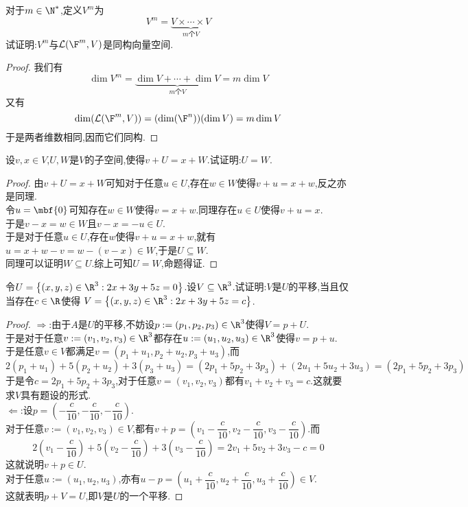 \documentclass{ctexart}
\begin{document}
\begin{problem}[5.]
    对于$m\in\N^*$,定义$V^m$为
    $$V^m=\underbrace{V\times\cdots\times V}_{m\text{个}V}$$
    试证明:$V^m$与$\mathcal{L}(\F^m,V)$是同构向量空间.
\end{problem}
\begin{proof}
    我们有$$\dim V^m=\underbrace{\dim V+\cdots+\dim V}_{m\text{个}V}=m\dim V$$
    又有$$\dim(\mathcal{L}(\F^m,V))=(\dim(\F^n))(\dim V)=m\dim V$$
    于是两者维数相同,因而它们同构.
\end{proof}
\begin{problem}[6.]
    设$v,x\in V$,$U,W$是$V$的子空间,使得$v+U=x+W$.试证明:$U=W$.
\end{problem}
\begin{proof}
    由$v+U=x+W$可知对于任意$u\in U$,存在$w\in W$使得$v+u=x+w$,反之亦是同理.\\
    令$u=\mbf{0}$可知存在$w\in W$使得$v=x+w$.同理存在$u\in U$使得$v+u=x$.\\
    于是$v-x=w\in W$且$v-x=-u\in U$.\\
    于是对于任意$u\in U$,存在$w$使得$v+u=x+w$,就有$u=x+w-v=w-(v-x)\in W$,于是$U\subseteq W$.\\
    同理可以证明$W\subseteq U$.综上可知$U=W$,命题得证.
\end{proof}
\begin{problem}[7.]
    令$U=\left\{(x,y,z)\in\R^3:2x+3y+5z=0\right\}$.设$V\subseteq\R^3$.试证明:$V$是$U$的平移,当且仅当存在$c\in\R$使得%
    $V=\left\{(x,y,z)\in\R^3:2x+3y+5z=c\right\}$.
\end{problem}
\begin{proof}
    $\Rightarrow$:由于$A$是$U$的平移,不妨设$p:=(p_1,p_2,p_3)\in\R^3$使得$V=p+U$.\\
    于是对于任意$v:=(v_1,v_2,v_3)\in\R^3$都存在$u:=(u_1,u_2,u_3)\in\R^3$使得$v=p+u$.\\
    于是任意$v\in V$都满足$v=(p_1+u_1,p_2+u_2,p_3+u_3)$,而
    $$2(p_1+u_1)+5(p_2+u_2)+3(p_3+u_3)=(2p_1+5p_2+3p_3)+(2u_1+5u_2+3u_3)=(2p_1+5p_2+3p_3)$$
    于是令$c=2p_1+5p_2+3p_3$,对于任意$v=(v_1,v_2,v_3)$都有$v_1+v_2+v_3=c$.这就要求$V$具有题设的形式.\\
    $\Leftarrow$:设$p=\left(-\dfrac{c}{10},-\dfrac{c}{10},-\dfrac{c}{10}\right)$.\\
    对于任意$v:=(v_1,v_2,v_3)\in V$,都有$v+p=\left(v_1-\dfrac{c}{10},v_2-\dfrac{c}{10},v_3-\dfrac{c}{10}\right)$.而
    $$2\left(v_1-\dfrac{c}{10}\right)+5\left(v_2-\dfrac{c}{10}\right)+3\left(v_3-\dfrac{c}{10}\right)=2v_1+5v_2+3v_3-c=0$$
    这就说明$v+p\in U$.\\
    对于任意$u:=(u_1,u_2,u_3)$,亦有$u-p=\left(u_1+\dfrac{c}{10},u_2+\dfrac{c}{10},u_3+\dfrac{c}{10}\right)\in V$.\\
    这就表明$p+V=U$,即$V$是$U$的一个平移.
\end{proof}
\end{document}
